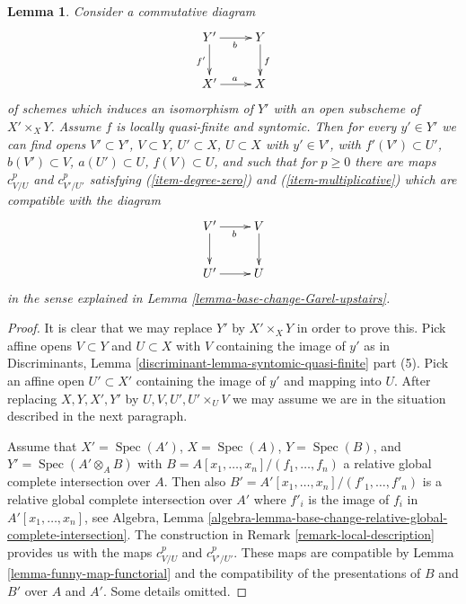 \documentclass[10pt,a4paper]{amsart}
\theoremstyle{plain}
\newtheorem{lemma}[subsection]{Lemma}
\theoremstyle{definition}
\theoremstyle{remark}
\numberwithin{equation}{subsection}
\def\Spec{\mathop{\mathrm{Spec}}}
\begin{document}
\begin{lemma}
\label{lemma-existence-base-change-Garel-upstairs}
Consider a commutative diagram
$$
\xymatrix{
Y' \ar[d]_{f'} \ar[r]_b & Y \ar[d]^f \\
X' \ar[r]^a & X
}
$$
of schemes which induces an isomorphism of $Y'$ with an open subscheme of
$X' \times_X Y$. Assume $f$ is locally quasi-finite and syntomic. Then for
every $y' \in Y'$ we can find opens $V' \subset Y'$,
$V \subset Y$, $U' \subset X$, $U \subset X$ with $y' \in V'$, with
$f'(V') \subset U'$, $b(V') \subset V$, $a(U') \subset U$,
$f(V) \subset U$, and such that for $p \geq 0$ there are maps
$c^p_{V/U}$ and $c^p_{V'/U'}$ satisfying (\ref{item-degree-zero})
and (\ref{item-multiplicative}) which are compatible with the diagram
$$
\xymatrix{
V' \ar[d] \ar[r]_b & V \ar[d] \\
U' \ar[r] & U
}
$$
in the sense explained in Lemma \ref{lemma-base-change-Garel-upstairs}.
\end{lemma}

\begin{proof}
It is clear that we may replace $Y'$ by $X' \times_X Y$ in order to prove this.
Pick affine opens $V \subset Y$ and $U \subset X$ with $V$ containing
the image of $y'$ as in
Discriminants, Lemma \ref{discriminant-lemma-syntomic-quasi-finite} part (5).
Pick an affine open $U' \subset X'$ containing the image of $y'$
and mapping into $U$. After replacing $X, Y, X', Y'$ by
$U, V, U', U' \times_U V$ we may assume we are in the situation
described in the next paragraph.

\medskip\noindent
Assume that $X' = \Spec(A')$, $X = \Spec(A)$, $Y = \Spec(B)$, and
$Y' = \Spec(A' \otimes_A B)$ with $B = A[x_1, \ldots, x_n]/(f_1, \ldots, f_n)$
a relative global complete intersection over $A$. Then also
$B' = A'[x_1, \ldots, x_n]/(f'_1, \ldots, f'_n)$ is a relative
global complete intersection over $A'$ where $f'_i$ is the image of $f_i$
in $A'[x_1, \ldots, x_n]$, see Algebra, Lemma
\ref{algebra-lemma-base-change-relative-global-complete-intersection}.
The construction in Remark \ref{remark-local-description}
provides us with the maps $c^p_{V/U}$ and $c^p_{V'/U'}$.
These maps are compatible by Lemma \ref{lemma-funny-map-functorial}
and the compatibility of the presentations of $B$ and $B'$ over
$A$ and $A'$. Some details omitted.
\end{proof}
\end{document}
